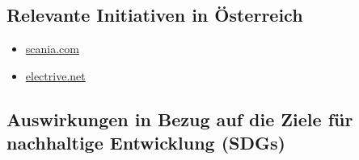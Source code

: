 \documentclass[
]{book}
\providecommand{\tightlist}{%
  \setlength{\itemsep}{0pt}\setlength{\parskip}{0pt}}
\begin{document}
\hypertarget{relevante-initiativen-in-uxf6sterreich-3}{%
\subsection*{Relevante Initiativen in Österreich}\label{relevante-initiativen-in-uxf6sterreich-3}}

\begin{itemize}
\tightlist
\item
  \href{https://www.scania.com/at/de/home/products-and-services/trucks/sustainability/elektro-mobilitaet/oberleitungs-lkw.html}{scania.com}
\item
  \href{https://www.electrive.net/2019/07/24/auswertung-der-these-zu-lastkraftwagen-an-oberleitungen/}{electrive.net}
\end{itemize}

\hypertarget{auswirkungen-in-bezug-auf-die-ziele-fuxfcr-nachhaltige-entwicklung-sdgs-3}{%
\subsection*{Auswirkungen in Bezug auf die Ziele für nachhaltige Entwicklung (SDGs)}\label{auswirkungen-in-bezug-auf-die-ziele-fuxfcr-nachhaltige-entwicklung-sdgs-3}}
\end{document}
